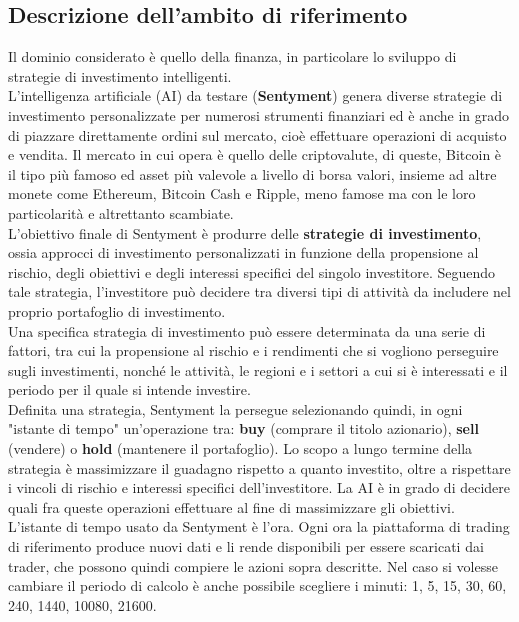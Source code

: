 \documentclass{article}
\numberwithin{equation}{section}
\begin{document}
	\subsection{Descrizione dell'ambito di riferimento}
		Il dominio considerato è quello della finanza, in particolare lo sviluppo di strategie di investimento intelligenti.\\
		L'intelligenza artificiale (AI) da testare (\textbf{Sentyment}) genera diverse strategie di investimento personalizzate per numerosi strumenti finanziari ed è anche in grado di piazzare direttamente ordini sul mercato, cioè effettuare operazioni di acquisto e vendita. Il mercato in cui opera è quello delle criptovalute, di queste, Bitcoin è il tipo più famoso ed asset più valevole a livello di borsa valori, insieme ad altre monete come Ethereum, Bitcoin Cash e Ripple, meno famose ma con le loro particolarità e altrettanto scambiate.\\
		L'obiettivo finale di Sentyment è produrre delle \textbf{strategie di investimento}, ossia approcci di investimento personalizzati in funzione della propensione al rischio, degli obiettivi e degli interessi specifici del singolo investitore. Seguendo tale strategia, l’investitore può decidere tra diversi tipi di attività da includere nel proprio portafoglio di investimento.\\
		Una specifica strategia di investimento può essere determinata da una serie di fattori, tra cui la propensione al rischio e i rendimenti che si vogliono perseguire sugli investimenti, nonché le attività, le regioni e i settori a cui si è interessati e il periodo per il quale si intende investire.\\
		Definita una strategia, Sentyment la persegue selezionando quindi, in ogni "istante di tempo" un'operazione tra: \textbf{buy} (comprare il titolo azionario), \textbf{sell} (vendere) o \textbf{hold} (mantenere il portafoglio). Lo scopo a lungo termine della strategia è massimizzare il guadagno rispetto a quanto investito, oltre a rispettare i vincoli di rischio e interessi specifici dell'investitore. La AI è in grado di decidere quali fra queste operazioni effettuare al fine di massimizzare gli obiettivi.\\
		L'istante di tempo usato da Sentyment è l'ora. Ogni ora la piattaforma di trading di riferimento produce nuovi dati e li rende disponibili per essere scaricati dai trader, che possono quindi compiere le azioni sopra descritte. Nel caso si volesse cambiare il periodo di calcolo è anche possibile scegliere i minuti: 1, 5, 15, 30, 60, 240, 1440, 10080, 21600.\\
		
\end{document}
